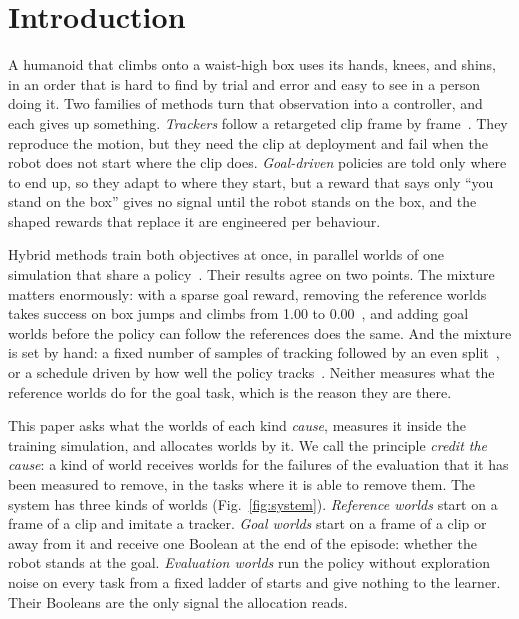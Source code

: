 \section{Introduction}

A humanoid that climbs onto a waist-high box uses its hands, knees, and shins, in an order that is hard to find by trial and error and easy to see in a person doing it. Two families of methods turn that observation into a controller, and each gives up something. \emph{Trackers} follow a retargeted clip frame by frame~\cite{deepmimic,beyondmimic,zest,omniretarget}. They reproduce the motion, but they need the clip at deployment and fail when the robot does not start where the clip does. \emph{Goal-driven} policies are told only where to end up, so they adapt to where they start, but a reward that says only ``you stand on the box'' gives no signal until the robot stands on the box, and the shaped rewards that replace it are engineered per behaviour.

Hybrid methods train both objectives at once, in parallel worlds of one simulation that share a policy~\cite{hil,wang2026generalizing}. Their results agree on two points. The mixture matters enormously: with a sparse goal reward, removing the reference worlds takes success on box jumps and climbs from 1.00 to 0.00~\cite{wang2026generalizing}, and adding goal worlds before the policy can follow the references does the same. And the mixture is set by hand: a fixed number of samples of tracking followed by an even split~\cite{hil}, or a schedule driven by how well the policy tracks~\cite{wang2026generalizing}. Neither measures what the reference worlds do for the goal task, which is the reason they are there.

This paper asks what the worlds of each kind \emph{cause}, measures it inside the training simulation, and allocates worlds by it. We call the principle \emph{credit the cause}: a kind of world receives worlds for the failures of the evaluation that it has been measured to remove, in the tasks where it is able to remove them. The system has three kinds of worlds (Fig.~\ref{fig:system}). \emph{Reference worlds} start on a frame of a clip and imitate a tracker. \emph{Goal worlds} start on a frame of a clip or away from it and receive one Boolean at the end of the episode: whether the robot stands at the goal. \emph{Evaluation worlds} run the policy without exploration noise on every task from a fixed ladder of starts and give nothing to the learner. Their Booleans are the only signal the allocation reads.

